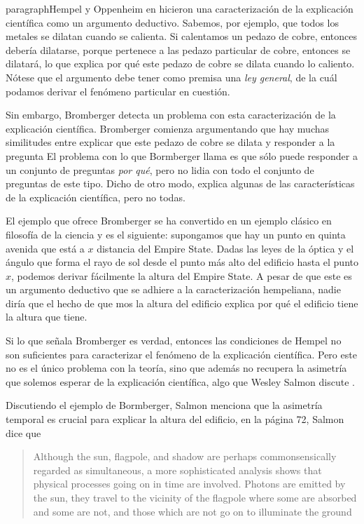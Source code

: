paragraph{Hempel y Oppenheim} en  hicieron una caracterización de la explicación científica como un argumento deductivo. Sabemos, por ejemplo, que todos los metales se dilatan cuando se calienta. Si calentamos un pedazo de cobre, entonces debería dilatarse, porque pertenece a las  pedazo particular de cobre, entonces se dilatará, lo que explica por qué este pedazo de cobre se dilata cuando lo caliento. Nótese que el argumento debe tener como premisa una \emph{ley general}, de la cuál podamos derivar el fenómeno particular en cuestión.

Sin embargo, Bromberger \citeyear{Bromberger1966} detecta un
problema con esta caracterización de la explicación científica.
Bromberger comienza argumentando que hay muchas similitudes entre
explicar que este pedazo de cobre se dilata y responder a la
pregunta  El problema con lo que Bormberger llama  es que sólo puede responder a un conjunto de preguntas
\emph{por qué}, pero no lidia con todo el conjunto de preguntas de
este tipo. Dicho de otro modo, explica algunas de las características
de la explicación científica, pero no todas.

El ejemplo que ofrece Bromberger se ha convertido en un ejemplo clásico en filosofía de la ciencia y es el siguiente: supongamos que hay un punto en quinta avenida que está a $x$ distancia del Empire State. Dadas las leyes de la óptica y el ángulo que forma el rayo de sol desde el punto más alto del edificio hasta el punto $x$, podemos derivar fácilmente la altura del Empire State. A pesar de que este es un argumento deductivo que se adhiere a la caracterización hempeliana, nadie diría que el hecho de que mos la altura del edificio explica por qué el edificio tiene la altura que tiene.

Si lo que señala Bromberger es verdad, entonces las condiciones de
Hempel no son suficientes para caracterizar el fenómeno de la
explicación científica. Pero este no es el único problema con la
teoría, sino que además no recupera la asimetría que solemos esperar
de la explicación científica, algo que Wesley Salmon discute
\citeyear{Salmon1970}.

Discutiendo el ejemplo de Bormberger, Salmon menciona que la
asimetría temporal es crucial para explicar la altura del edificio,
en la página 72, Salmon dice que

\begin{quote}
	Although the sun, flagpole, and shadow are perhaps
	commonsensically regarded as simultaneous, a more sophisticated
	analysis shows that physical processes going on in time are
	involved. Photons are emitted by the sun, they travel to the
	vicinity of the flagpole where some are absorbed and some are
	not, and those which are not go on to illuminate the ground
\end{quote}

